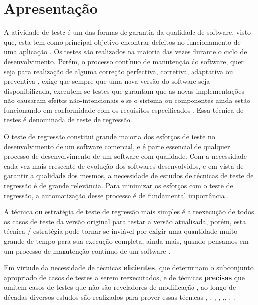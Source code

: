 
\section{Apresentação}

A atividade de teste é um das formas de garantia da qualidade de software, visto que, esta tem como principal objetivo encontrar defeitos no funcionamento de uma aplicação \cite{HIRAMA2011}. Os testes são realizados na maioria das vezes durante o ciclo de desenvolvimento. Porém, o processo contínuo de manutenção do software, quer seja para realização de alguma correção perfectiva, corretiva, adaptativa ou preventiva \cite{DBLP:series/springer/Mens08}, exige que sempre que uma nova versão do software seja disponibilizada, executem-se testes que garantam que as novas implementações não causaram efeitos não-intencionais e se o sistema ou componentes ainda estão funcionando em conformidade com os requisitos especificados \cite{159342}. Essa técnica de testes é denominada de teste de regressão.

O teste de regressão constitui grande maioria dos esforços de teste no desenvolvimento de um software comercial, e é parte essencial de qualquer processo de desenvolvimento de um software com qualidade. Com a necessidade cada vez mais crescente de evolução dos softwares desenvolvidos, e em vista de garantir a qualidade dos mesmos, a necessidade de estudos de técnicas de teste de regressão é de grande relevância. Para minimizar os esforços com o teste de regressão, a automatização desse processo é de fundamental importância \cite{Ammann:2008:IST:1355340}.

A técnica ou estratégia de teste de regressão mais simples é a reexecução de todos os casos de teste da versão original para testar a versão atualizada, porém, esta técnica / estratégia pode tornar-se inviável por exigir uma quantidade muito grande de tempo para sua execução completa, ainda mais, quando pensamos em um processo de manutenção contínuo de um software \cite{Graves:2001:ESR:367008.367020}.

Em virtude da necessidade de técnicas \textbf{eficientes}, que determinam o subconjunto apropriado de casos de testes a serem reexecutados, e de técnicas \textbf{precisas} que omitem casos de testes que não são reveladores de modificação \cite{Ammann:2008:IST:1355340}, ao longo de décadas diversos estudos são realizados para prover essas técnicas \cite{WHITE1991}, \cite{Graves:2001:ESR:367008.367020}, \cite{630875}, \cite{536955}, \cite{ENGSTROM201014},\cite{ENGSTROM201014}, \cite{KAZMI2017}, \cite{ROMANO201862}.


